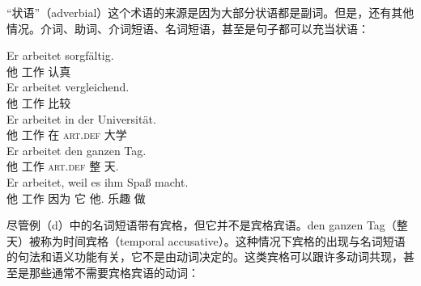 “状语”（adverbial）这个术语的来源是因为大部分状语都是副词。但是，还有其他情况。介词、助词、介词短语、名词短语，甚至是句子都可以充当状语：

\eal
\ex 
\gll Er arbeitet sorgfältig.\\
	 他 工作 认真\\
\ex 
\gll Er arbeitet vergleichend.\\
	 他 工作 比较\\
\ex 
\gll Er arbeitet in der Universität.\\
	 他 工作 在 \textsc{art}.\textsc{def} 大学\\
\ex 
\gll Er arbeitet den ganzen Tag.\\
     他 工作 \textsc{art}.\textsc{def} 整 天.\acc\\
\ex 
\gll Er arbeitet, weil es ihm Spaß macht.\\
	 他 工作 因为 它 他.\dat{} 乐趣 做\\
\zl

\noindent
尽管例（d）中的名词短语带有宾格，但它并不是宾格宾语。den ganzen Tag（整天）被称为时间宾格（temporal accusative）。这种情况下宾格的出现与名词短语的句法和语义功能有关，它不是由动词决定的。这类宾格可以跟许多动词共现，甚至是那些通常不需要宾格宾语的动词：


